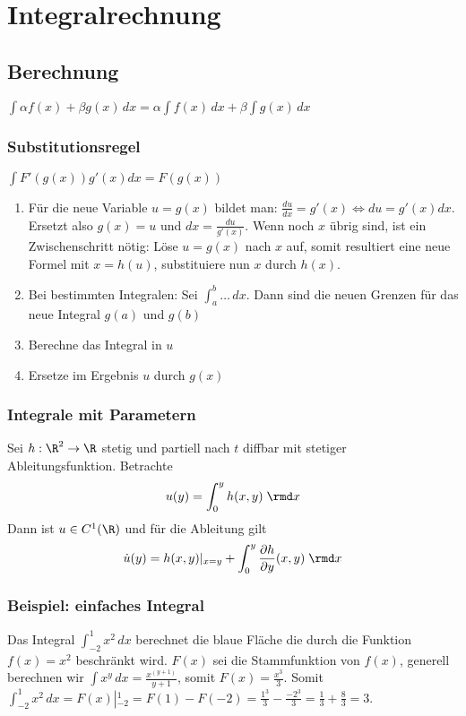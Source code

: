 \section{Integralrechnung}
\subsection{Berechnung}
$\int \alpha f(x) + \beta g(x)\,dx = \alpha \int f(x)\,dx + \beta \int g(x)\,dx$

\subsubsection{Substitutionsregel}
$\int F'(g(x)) g'(x)dx = F(g(x))$


\begin{enumerate}
	\item Für die neue Variable $u = g(x)$ bildet man: $\frac{du}{dx} = g'(x)
	\Leftrightarrow du = g'(x)dx$. Ersetzt also $g(x) = u$ und $dx =
	\frac{du}{g'(x)}$. Wenn noch $x$ übrig sind, ist ein Zwischenschritt nötig:
	Löse $u = g(x)$ nach $x$ auf, somit resultiert eine neue Formel mit 
	$x = h(u)$, substituiere nun $x$ durch $h(x)$.
	\item Bei bestimmten Integralen: Sei $\int_a^b \ldots \,dx$. Dann sind die neuen
	Grenzen für das neue Integral $g(a)$ und $g(b)$
	\item Berechne das Integral in $u$
	\item Ersetze im Ergebnis $u$ durch $g(x)$
\end{enumerate}


\subsubsection{Integrale mit Parametern}
	Sei $h: \R^2 \to \R$ stetig und partiell nach $t$ diffbar mit stetiger Ableitungsfunktion. Betrachte 
	\[ u(y) = \int_0^y h(x,y) \; \rmd x \]
	Dann ist $u \in C^1(\R)$ und für die Ableitung gilt
	\[ \dot{u}(y) = h(x,y)|_{x=y} + \int_0^y \frac{\partial h}{\partial y} (x,y) \; \rmd x \]

\subsubsection{Beispiel: einfaches Integral}
Das Integral $\int_{-2}^1 x^2 \,dx$ berechnet die blaue Fläche die durch die Funktion $f(x) = x^2$ beschränkt wird.
$F(x)$ sei die Stammfunktion von $f(x)$,  generell berechnen wir $\int x^y \,dx = \frac{x^{(y+1)}}{y+1}$, somit $F(x) = \frac{x^3}{3}$.
Somit $\int_{-2}^1 x^2 \,dx = F(x) \left |_{-2}^1 \right. = F(1) - F(-2) =  \frac{1^3}{3} -  \frac{-2^3}{3} = \frac{1}{3} +  \frac{8}{3} = 3.$

